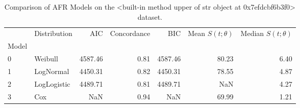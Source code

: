 \begin{table}
\caption{Comparison of AFR Models on the <built-in method upper of str object at 0x7efdcbf6b3f0> dataset.}
\label{tab:cifar10}
\begin{tabular}{llrrrrr}
\toprule
 & Distribution & AIC & Concordance & BIC & Mean $S(t;\theta)$ & Median $S(t;\theta)$ \\
Model &  &  &  &  &  &  \\
\midrule
0 & Weibull & 4587.46 & 0.81 & 4587.46 & 80.23 & 6.40 \\
1 & LogNormal & 4450.31 & 0.82 & 4450.31 & 78.55 & 4.87 \\
2 & LogLogistic & 4489.71 & 0.81 & 4489.71 & NaN & 4.27 \\
3 & Cox & NaN & 0.94 & NaN & 69.99 & 1.21 \\
\bottomrule
\end{tabular}
\end{table}
